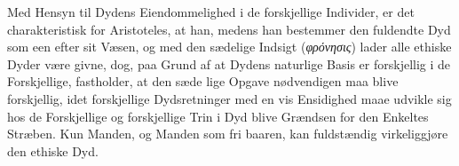 \documentclass[12pt,a4paper]{book}
\newcommand{\gk}[1]{\textit{#1}}
\begin{document}
Med Hensyn til Dydens Eiendommelighed i de forskjellige
Individer, er det charakteristisk for Aristoteles, at han, medens
han bestemmer den fuldendte Dyd som een efter sit Væsen,
og med den sædelige Indsigt (\gk{φρόνησις}) lader alle ethiske
Dyder være givne, dog, paa Grund af at Dydens naturlige
Basis er forskjellig i de Forskjellige, fastholder, at den sæde\-%
lige Opgave nødvendigen maa blive forskjellig, idet forskjellige
Dydsretninger med en vis Ensidighed maae udvikle sig hos
de Forskjellige og forskjellige Trin i Dyd blive Grændsen for
den Enkeltes Stræben. Kun Manden, og Manden som fri\-%
baaren, kan fuldstændig virkeliggjøre den ethiske Dyd.
\end{document}
